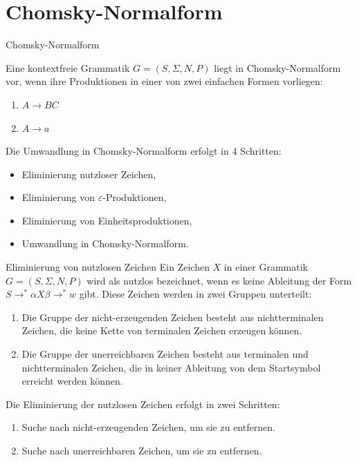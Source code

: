 \documentclass{beamer}
\begin{document}
	\section{Chomsky-Normalform}
	
		\begin{frame}{Chomsky-Normalform}
			\begin{definition}
				Eine kontextfreie Grammatik $G = (S, \Sigma, N, P)$ liegt in Chomsky-Normalform vor, wenn ihre Produktionen in einer von zwei einfachen Formen vorliegen:
				\begin{enumerate}
					\item $A \to BC$
					\item $A \to a$
				\end{enumerate}
			\end{definition}
			\pause
			Die Umwandlung in Chomsky-Normalform erfolgt in 4 Schritten:
			\begin{itemize}
				\item Eliminierung nutzloser Zeichen,
				\item Eliminierung von $\varepsilon$-Produktionen,
				\item Eliminierung von Einheitsproduktionen,
				\item Umwandlung in Chomsky-Normalform.
			\end{itemize}
		\end{frame}
		
		\begin{frame}{Eliminierung von nutzlosen Zeichen}
			Ein Zeichen $X$ in einer Grammatik $G = (S, \Sigma, N, P)$ wird als nutzlos bezeichnet, wenn es keine Ableitung der Form $S \to^{*} \alpha X \beta \to^{*} w$ gibt.
			\pause
			Diese Zeichen werden in zwei Gruppen unterteilt:
			\begin{enumerate}
				\item Die Gruppe der nicht-erzeugenden Zeichen besteht aus nichtterminalen Zeichen, die keine Kette von terminalen Zeichen erzeugen können.
				\item Die Gruppe der unerreichbaren Zeichen besteht aus terminalen und nichtterminalen Zeichen, die in keiner Ableitung von dem Startsymbol erreicht werden können.
			\end{enumerate}
			\pause
			Die Eliminierung der nutzlosen Zeichen erfolgt in zwei Schritten:
			\begin{enumerate}
				\item Suche nach nicht-erzeugenden Zeichen, um sie zu entfernen.
				\item Suche nach unerreichbaren Zeichen, um sie zu entfernen.
			\end{enumerate}
		\end{frame}
	
\end{document}
